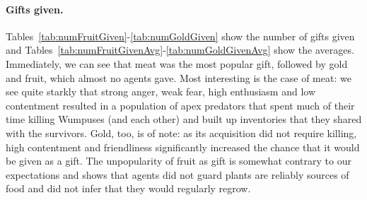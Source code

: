 \paragraph{Gifts given.} Tables~\ref{tab:numFruitGiven}-\ref{tab:numGoldGiven} show the number of gifts given and Tables~\ref{tab:numFruitGivenAvg}-\ref{tab:numGoldGivenAvg} show the averages. Immediately, we can see that meat was the most popular gift, followed by gold and fruit, which almost no agents gave. Most interesting is the case of meat: we see quite starkly that strong anger, weak fear, high enthusiasm and low contentment resulted in a population of apex predators that spent much of their time killing Wumpuses (and each other) and built up inventories that they shared with the survivors. Gold, too, is of note: as its acquisition did not require killing, high contentment and friendliness significantly increased the chance that it would be given as a gift. The unpopularity of fruit as gift is somewhat contrary to our expectations and shows that agents did not guard plants are reliably sources of food and did not infer that they would regularly regrow.

